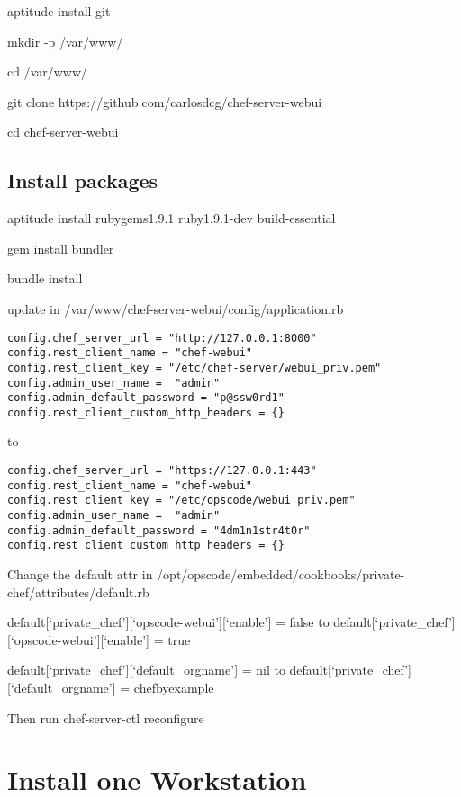 aptitude install git

mkdir -p /var/www/

cd /var/www/

git clone https://github.com/carlosdcg/chef-server-webui

cd chef-server-webui

\subsection{Install packages}

aptitude install rubygems1.9.1 ruby1.9.1-dev build-essential

gem install bundler

bundle install

update in /var/www/chef-server-webui/config/application.rb

\begin{verbatim}
config.chef_server_url = "http://127.0.0.1:8000"
config.rest_client_name = "chef-webui"
config.rest_client_key = "/etc/chef-server/webui_priv.pem"
config.admin_user_name =  "admin"
config.admin_default_password = "p@ssw0rd1"
config.rest_client_custom_http_headers = {}
\end{verbatim}

to

\begin{verbatim}
config.chef_server_url = "https://127.0.0.1:443"
config.rest_client_name = "chef-webui"
config.rest_client_key = "/etc/opscode/webui_priv.pem"
config.admin_user_name =  "admin"
config.admin_default_password = "4dm1n1str4t0r"
config.rest_client_custom_http_headers = {}
\end{verbatim}

Change the default attr in /opt/opscode/embedded/cookbooks/private-chef/attributes/default.rb

default[`private\_chef'][`opscode-webui'][`enable'] = false
to
default[`private\_chef'][`opscode-webui'][`enable'] = true

default[`private\_chef'][`default\_orgname'] = nil
to
default[`private\_chef'][`default\_orgname'] = chefbyexample

Then run
chef-server-ctl reconfigure

\section{Install one Workstation}